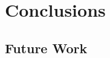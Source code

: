 \documentclass{mpaper}
\begin{document}
\section{Conclusions}



\subsection{Future Work}






\end{document}
